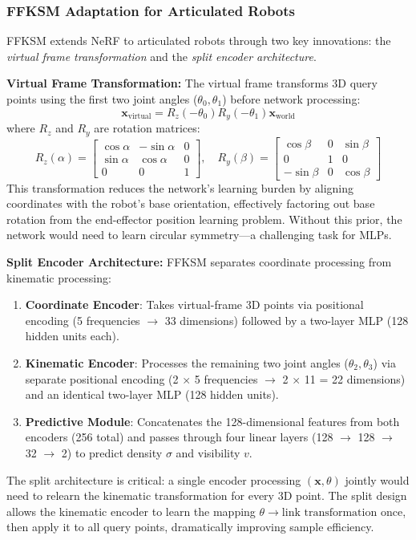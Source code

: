 \documentclass[12pt,a4paper,oneside]{report}
\begin{document}
\subsubsection{FFKSM Adaptation for Articulated Robots}

FFKSM extends NeRF to articulated robots through two key innovations: the \textit{virtual frame transformation} and the \textit{split encoder architecture}.

\textbf{Virtual Frame Transformation:} The virtual frame transforms 3D query points using the first two joint angles ($\theta_0, \theta_1$) before network processing:
\begin{equation}
\mathbf{x}_{\text{virtual}} = R_z(-\theta_0) R_y(-\theta_1) \mathbf{x}_{\text{world}}
\end{equation}
where $R_z$ and $R_y$ are rotation matrices:
\begin{equation}
R_z(\alpha) = \begin{bmatrix}
\cos\alpha & -\sin\alpha & 0 \\
\sin\alpha & \cos\alpha & 0 \\
0 & 0 & 1
\end{bmatrix}, \quad
R_y(\beta) = \begin{bmatrix}
\cos\beta & 0 & \sin\beta \\
0 & 1 & 0 \\
-\sin\beta & 0 & \cos\beta
\end{bmatrix}
\end{equation}
This transformation reduces the network's learning burden by aligning coordinates with the robot's base orientation, effectively factoring out base rotation from the end-effector position learning problem. Without this prior, the network would need to learn circular symmetry---a challenging task for MLPs.

\textbf{Split Encoder Architecture:} FFKSM separates coordinate processing from kinematic processing:
\begin{enumerate}
    \item \textbf{Coordinate Encoder}: Takes virtual-frame 3D points via positional encoding (5 frequencies $\rightarrow$ 33 dimensions) followed by a two-layer MLP (128 hidden units each).
    \item \textbf{Kinematic Encoder}: Processes the remaining two joint angles ($\theta_2, \theta_3$) via separate positional encoding (2 $\times$ 5 frequencies $\rightarrow$ 2 $\times$ 11 = 22 dimensions) and an identical two-layer MLP (128 hidden units).
    \item \textbf{Predictive Module}: Concatenates the 128-dimensional features from both encoders (256 total) and passes through four linear layers (128 $\rightarrow$ 128 $\rightarrow$ 32 $\rightarrow$ 2) to predict density $\sigma$ and visibility $v$.
\end{enumerate}
The split architecture is critical: a single encoder processing $(\mathbf{x}, \theta)$ jointly would need to relearn the kinematic transformation for every 3D point. The split design allows the kinematic encoder to learn the mapping $\theta \rightarrow \text{link transformation}$ once, then apply it to all query points, dramatically improving sample efficiency.
\end{document}

